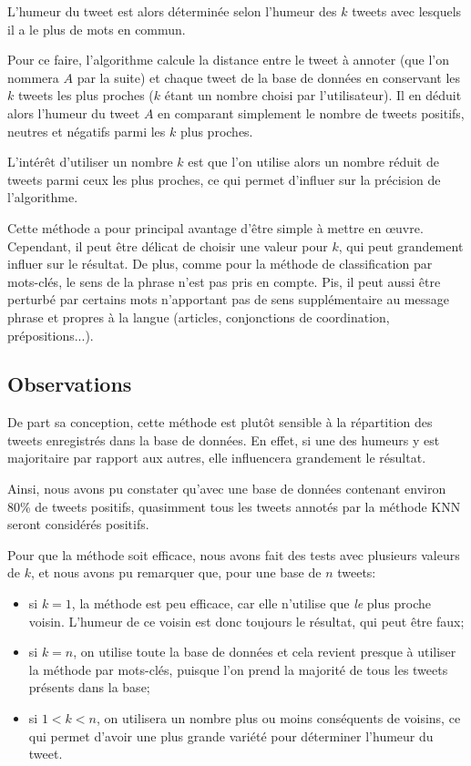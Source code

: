 \documentclass[12pt,a4paper]{report}
\begin{document}
L'humeur du tweet est alors déterminée selon l'humeur des $k$ tweets
avec lesquels il a le plus de mots en commun.

Pour ce faire, l'algorithme calcule la distance entre le tweet à annoter (que
l'on nommera $A$ par la suite) et chaque tweet de la base de données
en conservant les $k$ tweets les plus proches ($k$ étant un nombre
choisi par l'utilisateur). Il en déduit alors l'humeur du tweet $A$ en comparant
simplement le nombre de tweets positifs, neutres et négatifs parmi les $k$ plus
proches.

L'intérêt d'utiliser un nombre $k$ est que l'on utilise alors un nombre réduit
de tweets parmi ceux les plus proches, ce qui permet d'influer sur la précision
de l'algorithme.

Cette méthode a pour principal avantage d'être simple à mettre en œuvre.
Cependant, il peut être délicat de choisir une valeur pour $k$, qui peut
grandement influer sur le résultat. De plus, comme pour la méthode de
classification par mots-clés, le sens de la phrase n'est pas pris en compte.
Pis, il peut aussi être perturbé par certains mots n'apportant pas de sens
supplémentaire au message phrase et propres à la langue (articles, conjonctions
de coordination, prépositions...).

\subsection{Observations}
De part sa conception, cette méthode est plutôt sensible à la répartition des
tweets enregistrés dans la base de données. En effet, si une des humeurs y est
majoritaire par rapport aux autres, elle influencera grandement le résultat.

Ainsi, nous avons pu constater qu'avec une base de données contenant environ
80\% de tweets positifs, quasimment tous les tweets annotés par la méthode KNN
seront considérés positifs.

Pour que la méthode soit efficace, nous avons fait des tests avec plusieurs
valeurs de $k$, et nous avons pu remarquer que, pour une base de $n$ tweets:

\begin{itemize}
    \item si $k=1$, la méthode est peu efficace, car elle n'utilise que
        \textit{le} plus proche voisin. L'humeur de ce voisin est donc
        toujours le résultat, qui peut être faux;
    \item si $k=n$, on utilise toute la base de données et cela revient presque
        à utiliser la méthode par mots-clés, puisque l'on prend la majorité de
        tous les tweets présents dans la base;
    \item si $1 < k < n$, on utilisera un nombre plus ou moins conséquents de
        voisins, ce qui permet d'avoir une plus grande variété pour déterminer
        l'humeur du tweet.
\end{itemize}
\end{document}
